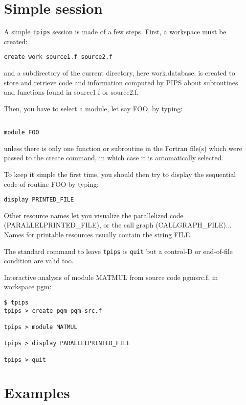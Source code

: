 \documentclass[a4paper,12pt]{article}
\begin{document}
\section{Simple session} 

A simple {\tt tpips} session is made of a few steps. First, a
workspace must be created:
{\bf
\begin{verbatim}
create work source1.f source2.f
\end{verbatim}
}

and a subdirectory of the current directory, here
work.database, is created to store and retrieve
code and information computed by PIPS about subroutines and
functions found in source1.f or source2.f.

Then, you have to select a module, let say FOO, by typing:
{\bf
\begin{verbatim}

module FOO
\end{verbatim}
}

unless there is only one function or subroutine in the Fortran
file(s) which were passed to the create command, in
which case it is automatically selected.

To keep it simple the first time, you should then try to
display the sequential code of routine FOO by typing:

{\bf
\begin{verbatim}
display PRINTED_FILE
\end{verbatim}
}

Other resource names let you visualize the parallelized code
(PARALLELPRINTED\_FILE), or the call graph (CALLGRAPH\_FILE)...
Names for printable resources usually contain the string
FILE. 

The standard command to leave {\tt tpips} is {\tt quit} but a control-D
or end-of-file condition are valid too.

Interactive analysis of module MATMUL from source code pgmsrc.f,
in workspace pgm:

{\bf
\begin{verbatim}
$ tpips
tpips > create pgm pgm-src.f

tpips > module MATMUL

tpips > display PARALLELPRINTED_FILE

tpips > quit

\end{verbatim}
}

\section{Examples}
\end{document}
